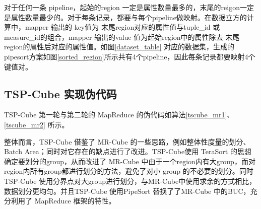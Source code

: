 对于任何一条 pipeline，起始的region 一定是属性数量最多的，末尾的reigon一定是属性数量最少的。对于每条记录，都要与每个pipeline做映射。在数据立方的计算中，mapper 输出的 key值为 末尾region对应的属性值与tuple\_id 或 measure\_id的组合，mapper 输出的value 值为起始region中的属性除去 末尾region的属性后对应的属性值。如图\ref{dataset_table} 对应的数据集，生成的pipesort方案如图\ref{sorted_region}所示共有4个pipeline，因此每条记录都要映射4个键值对。

\subsection{TSP-Cube 实现伪代码}

TSP-Cube 第一轮与第二轮的 MapReduce 的伪代码如算法\ref{tscube_mr1}、\ref{tscube_mr2} 所示。

整体而言，TSP-Cube 借鉴了 MR-Cube 的一些思路，例如整体性度量的划分、Batch Area；同时对它存在的缺点进行了改进。TSP-Cube使用 TeraSort 的思想确定要划分的group，从而改进了 MR-Cube 中由于一个region内有大group，而对region内所有group都进行划分的方法，避免了对小 group 的不必要的划分。同时 TSP-Cube 使用分界点对大group进行划分，与MR-Cube中使用求余的方式相比，数据划分更均匀。并且TSP-Cube 使用PipeSort 替换了了MR-Cube 中的BUC，充分利用了 MapReduce 框架的特性。

